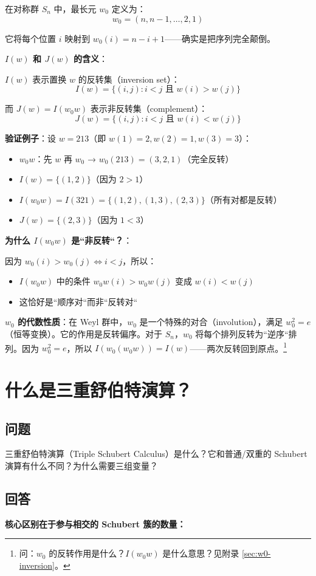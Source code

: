 在对称群 $S_n$ 中，最长元 $w_0$ 定义为：
$$w_0 = (n, n-1, \ldots, 2, 1)$$

它将每个位置 $i$ 映射到 $w_0(i) = n - i + 1$——确实是把序列完全颠倒。

\textbf{$I(w)$ 和 $J(w)$ 的含义}：

$I(w)$ 表示置换 $w$ 的反转集（inversion set）：
$$I(w) = \{(i,j) : i < j \text{ 且 } w(i) > w(j)\}$$

而 $J(w) = I(w_0 w)$ 表示非反转集（complement）：
$$J(w) = \{(i,j) : i < j \text{ 且 } w(i) < w(j)\}$$

\textbf{验证例子}：设 $w = 213$（即 $w(1)=2, w(2)=1, w(3)=3$）：
\begin{itemize}
\item $w_0 w$：先 $w$ 再 $w_0$ → $w_0(213) = (3,2,1)$（完全反转）
\item $I(w) = \{(1,2)\}$（因为 $2 > 1$）
\item $I(w_0 w) = I(321) = \{(1,2), (1,3), (2,3)\}$（所有对都是反转）
\item $J(w) = \{(2,3)\}$（因为 $1 < 3$）
\end{itemize}

\textbf{为什么 $I(w_0 w)$ 是``非反转``？}：

因为 $w_0(i) > w_0(j) \iff i < j$，所以：
\begin{itemize}
\item $I(w_0 w)$ 中的条件 $w_0 w(i) > w_0 w(j)$ 变成 $w(i) < w(j)$
\item 这恰好是``顺序对``而非``反转对``
\end{itemize}

\textbf{$w_0$ 的代数性质}：在 Weyl 群中，$w_0$ 是一个特殊的对合（involution），满足 $w_0^2 = e$（恒等变换）。它的作用是反转偏序。对于 $S_n$，$w_0$ 将每个排列反转为``逆序``排列。因为 $w_0^2 = e$，所以 $I(w_0(w_0 w)) = I(w)$——两次反转回到原点。\footnote{问：$w_0$ 的反转作用是什么？$I(w_0 w)$ 是什么意思？见附录 \cref{sec:w0-inversion}。}
\section{什么是三重舒伯特演算？}\label{sec:TripleSchubertCalculus}
\subsection{问题}
三重舒伯特演算（Triple Schubert Calculus）是什么？它和普通/双重的 Schubert 演算有什么不同？为什么需要三组变量？
\subsection{回答}
\textbf{核心区别在于参与相交的 Schubert 簇的数量：}

